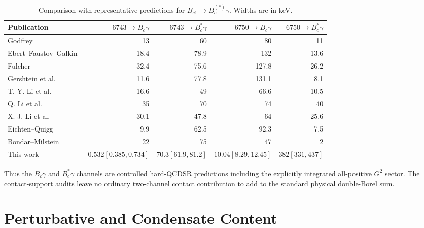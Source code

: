 \documentclass[11pt]{article}
\newcommand{\Bc}{B_c}
\newcommand{\Bcst}{B_c^\ast}
\begin{document}
\begin{table}[h]
\centering
\caption{Comparison with representative predictions for
\(B_{c1}\to B_c^{(\ast)}\gamma\).  Widths are in keV.}
\scriptsize
\setlength{\tabcolsep}{3pt}
\begin{tabular}{p{}rrrr}
\toprule
Publication
& \(6743\to B_c\gamma\)
& \(6743\to B_c^\ast\gamma\)
& \(6750\to B_c\gamma\)
& \(6750\to B_c^\ast\gamma\)\\
\midrule
Godfrey~\cite{Godfrey2004} & 13 & 60 & 80 & 11\\
Ebert--Faustov--Galkin~\cite{Ebert2003} & 18.4 & 78.9 & 132 & 13.6\\
Fulcher~\cite{Fulcher1999} & 32.4 & 75.6 & 127.8 & 26.2\\
Gershtein et al.~\cite{Gershtein1995} & 11.6 & 77.8 & 131.1 & 8.1\\
T. Y. Li et al.~\cite{LiTang2023} & 16.6 & 49 & 66.6 & 10.5\\
Q. Li et al.~\cite{LiZhong2019} & 35 & 70 & 74 & 40\\
X. J. Li et al.~\cite{LiLiu2023} & 30.1 & 47.8 & 64 & 25.6\\
Eichten--Quigg~\cite{EichtenQuigg2018} & 9.9 & 62.5 & 92.3 & 7.5\\
Bondar--Milstein~\cite{BondarMilstein2025} & 22 & 75 & 47 & 2\\
This work & \(0.532[0.385,0.734]\) & \(70.3[61.9,81.2]\)
& \(10.04[8.29,12.45]\) & \(382[331,437]\)\\
\bottomrule
\end{tabular}
\label{tab:bc1-radiative-comparison}
\end{table}

Thus the \(\Bc\gamma\) and \(\Bcst\gamma\) channels are controlled hard-QCDSR
predictions including the explicitly integrated all-positive \(G^2\) sector.
The contact-support audits leave no ordinary two-channel contact contribution
to add to the standard physical double-Borel sum.

\section{Perturbative and Condensate Content}
\end{document}
